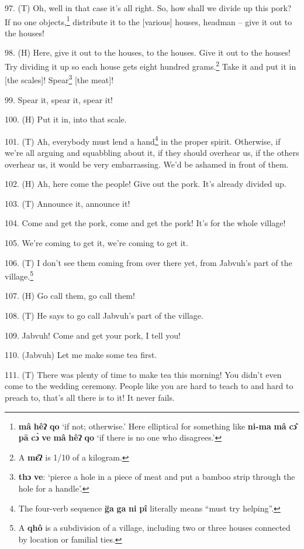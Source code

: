 97. (T) Oh, well in that case it's all right. So, how shall we divide up this pork?
If no one objects,\footnote{\textbf{mâ} \textbf{hêʔ} \textbf{qo} `if not; otherwise.' Here elliptical for something like \textbf{ni-ma} \textbf{mâ} \textbf{cɔ̂} \textbf{pā} \textbf{cɔ̀} \textbf{ve} \textbf{mâ} \textbf{hêʔ} \textbf{qo} `if there is no one who disagrees.'} distribute it to the [various] houses, headman -- give it
out to the houses!

98. (H) Here, give it out to the houses, to the houses. Give it out to the houses!
Try dividing it up so each house gets eight hundred grams.\footnote{A \textbf{mɛ̂ʔ} is 1/10 of a kilogram.} Take it and put
it in [the scales]! Spear\footnote{\textbf{thɔ} \textbf{ve}: `pierce a hole in a piece of meat and put a bamboo strip through the hole for a handle'.} [the meat]!

99. Spear it, spear it, spear it!

100. (H) Put it in, into that scale.

101. (T) Ah, everybody must lend a hand\footnote{The four-verb sequence \textbf{g̈a} \textbf{ga} \textbf{ni} \textbf{pî} literally means ``must try helping''.} in the proper spirit. Otherwise, if
we're all arguing and squabbling about it, if they should overhear us, if the others
overhear us, it would be very embarrassing. We'd be ashamed in front of them.

102. (H) Ah, here come the people! Give out the pork. It's already divided up.

103. (T) Announce it, announce it!

104. Come and get the pork, come and get the pork! It's for the whole village!

105. We're coming to get it, we're coming to get it.

106. (T) I don't see them coming from over there yet, from Jabvuh's part of the
village.\footnote{A \textbf{qhô} is a subdivision of a village, including two or three houses connected by location or familial ties.}

107. (H) Go call them, go call them!

108. (T) He says to go call Jabvuh's part of the village.

109. Jabvuh! Come and get your pork, I tell you!

110. (Jabvuh)  Let me make some tea first.

111. (T) There was plenty of time to make tea this morning! You didn't even come
to the wedding ceremony. People like you are hard to teach to and hard to preach
to, that's all there is to it! It never fails.

